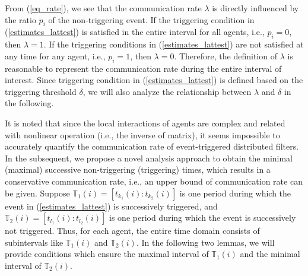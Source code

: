 \documentclass[journal,transmag]{IEEEtran}
\begin{document}
{From (\ref{eq_rate}), we see that the communication rate $\lambda$ is directly influenced by the ratio $p_i$ of the non-triggering event. If the triggering condition in (\ref{estimates_lattest}) is satisfied in the entire interval for all agents, i.e., $p_i=0$, then $\lambda=1$. If the triggering conditions in (\ref{estimates_lattest}) are not satisfied at any time for any agent, i.e., $p_i=1$, then $\lambda=0$.
Therefore, the definition of $\lambda$ is reasonable  to represent the communication rate during the entire interval  of interest.
Since triggering condition in (\ref{estimates_lattest}) is defined based on the triggering threshold $\delta$, we will also analyze the  relationship between $\lambda$ and $\delta$ in the following.


It is noted that since the local interactions of agents are complex and related with nonlinear operation (i.e., the inverse of matrix), it seems impossible to accurately quantify the communication rate of event-triggered distributed filters. In the subsequent, we propose a novel analysis approach to obtain the minimal (maximal) successive non-triggering (triggering) times, which results in a conservative communication rate, i.e., an upper bound of communication rate can be given.	
Suppose $\mathbb{T}_1(i)=[t_{k_1}(i):t_{k_2}(i)]$ is one period during which the event in (\ref{estimates_lattest}) is successively triggered, and $\mathbb{T}_2(i)=[t_{l_1}(i):t_{l_2}(i)]$ is one period during which the event is successively not triggered. Thus, for each agent, the entire time domain consists of subintervals like $\mathbb{T}_1(i)$ and $\mathbb{T}_2(i)$.
In the following two lemmas, we will provide conditions which ensure the maximal interval of $\mathbb{T}_1(i)$ and the minimal interval of $\mathbb{T}_2(i)$. 



}
\end{document}

